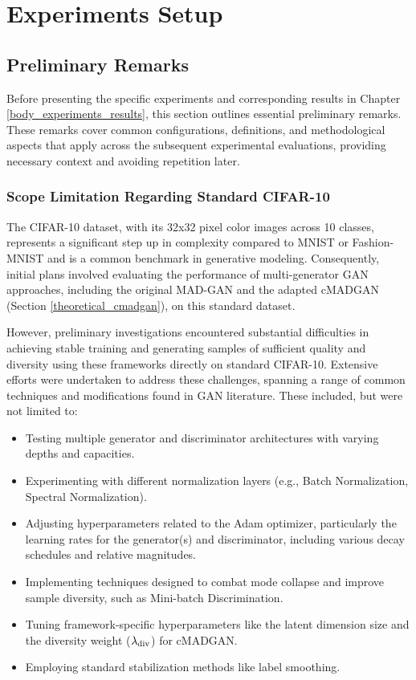 \section{Experiments Setup}\label{body_experiments_setup}

\subsection{Preliminary Remarks}\label{body_prelim}
Before presenting the specific experiments and corresponding results in Chapter \ref{body_experiments_results}, this section outlines essential preliminary remarks. These remarks cover common configurations, definitions, and methodological aspects that apply across the subsequent experimental evaluations, providing necessary context and avoiding repetition later.

\subsubsection{Scope Limitation Regarding Standard CIFAR-10}
\label{setup_cifar10_scope}

The CIFAR-10 dataset, with its 32x32 pixel color images across 10 classes, represents a significant step up in complexity compared to MNIST or Fashion-MNIST and is a common benchmark in generative modeling. Consequently, initial plans involved evaluating the performance of multi-generator GAN approaches, including the original MAD-GAN \cite{ghosh2018madgan} and the adapted cMADGAN (Section \ref{theoretical_cmadgan}), on this standard dataset.

However, preliminary investigations encountered substantial difficulties in achieving stable training and generating samples of sufficient quality and diversity using these frameworks directly on standard CIFAR-10. Extensive efforts were undertaken to address these challenges, spanning a range of common techniques and modifications found in GAN literature. These included, but were not limited to:

\begin{itemize}
    \item Testing multiple generator and discriminator architectures with varying depths and capacities.
    \item Experimenting with different normalization layers (e.g., Batch Normalization, Spectral Normalization).
    \item Adjusting hyperparameters related to the Adam optimizer, particularly the learning rates for the generator(s) and discriminator, including various decay schedules and relative magnitudes.
    \item Implementing techniques designed to combat mode collapse and improve sample diversity, such as Mini-batch Discrimination.
    \item Tuning framework-specific hyperparameters like the latent dimension size and the diversity weight (\( \lambda_{\text{div}} \)) for cMADGAN.
    \item Employing standard stabilization methods like label smoothing.
\end{itemize}

